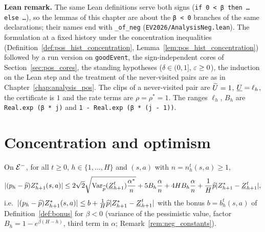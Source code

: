 \textbf{Lean remark.} The same Lean definitions serve both signs (\texttt{if 0 < β then \ldots else \ldots}),
so the lemmas of this chapter are about the \texttt{β < 0} branches of the same declarations; their
names end with \texttt{\_of\_neg} (\texttt{EV2026/AnalysisNeg.lean}). The
formulation at a fixed history under the concentration inequalities
(Definition~\ref{def:pos_hist_concentration}, Lemma~\ref{lem:pos_hist_concentration}) followed by a
run version on \texttt{goodEvent}, the sign-independent cores of Section~\ref{sec:pos_cores}, the
standing hypotheses ($\delta \in (0, 1]$, $\varepsilon \ge 0$), the induction on the Lean step and the
treatment of the never-visited pairs are as in Chapter~\ref{chap:analysis_pos}. The clips of a never-visited pair
are $\widetilde{U} = 1$, $\underline{U} = \ell_h$, the certificate is $1$ and the rate terms are $\rho = \rho^* = 1$. The
ranges $\ell_h$, $B_h$ are \texttt{Real.exp (β * j)} and \texttt{1 - Real.exp (β * (j - 1))}.

\section{Concentration and optimism}
\label{sec:neg_optimism}

\begin{lemma}\label{lem:concentration_neg}
\leanok
{}
On $\mathcal{E}^-$, for all $t \ge 0$, $h \in \{1, \dots, H\}$ and $(s,a)$ with $n = n_h^t(s,a) \ge 1$,
\[
  \lvert (p_h - \widehat{p}) Z^*_{h+1}(s,a) \rvert
  \le 2\sqrt2 \sqrt{\operatorname{Var}_{\widehat{p}}(\underline{Z}^t_{h+1}) \frac{\alpha^*}{n}}
  + 5 B_h \frac{\alpha}{n} + 4 H B_h \frac{\alpha}{n}
  + \frac1H \widehat{p} \lvert Z^*_{h+1} - \underline{Z}^t_{h+1} \rvert ,
\]
i.e.\ $\lvert (p_h - \widehat{p}) Z^*_{h+1}(s,a) \rvert \le b + \frac1H \widehat{p}\lvert Z^*_{h+1} - \underline{Z}^t_{h+1} \rvert$ with the bonus
$b = b_h^t(s,a)$ of Definition~\ref{def:bonus} for $\beta < 0$ (variance of the pessimistic value,
factor $B_h = 1 - e^{\beta(H-h)}$, third term in $\alpha$; Remark~\ref{rem:neg_constants}).
\end{lemma}

